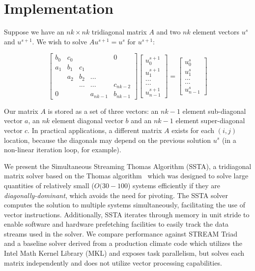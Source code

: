 \documentclass{sig-alternate-05-2015}
\begin{document}
\section{Implementation}
\label{sec:implementation}

Suppose we have an \(nk \times nk\) tridiagonal matrix \(A\) and two \(nk\) element
  vectors \(u^{s}\) and \(u^{s+1}\).  We wish to solve \(Au^{s+1} = u^{s}\) for
  \(u^{s+1}\):

\[
\begin{bmatrix}
b_0 & c_0 &     &          & 0        \\
a_1 & b_1 & c_1 &          &          \\
    & a_2 & b_2 & ...      &          \\
    &     & ... & ...      & c_{nk-2} \\
0   &     &     & a_{nk-1} & b_{nk-1}
\end{bmatrix}
\begin{bmatrix}
u^{s+1}_0     \\
u^{s+1}_1     \\
...     \\
...     \\
u^{s+1}_{n-1}
\end{bmatrix}
=
\begin{bmatrix}
u^{s}_0     \\
u^{s}_1     \\
...     \\
...     \\
u^{s}_{n-1}
\end{bmatrix}
\]

Our matrix \(A\) is stored as a set of three vectors: an \(nk-1\) element
  sub-diagonal vector \(a\), an \(nk\) element diagonal vector \(b\) and an
  \(nk-1\) element super-diagonal vector \(c\).
In practical applications, a different matrix \(A\) exists for each \((i,j)\)
  location, because the diagonals may depend on the previous solution \(u^{s}\)
  (in a non-linear iteration loop, for example).

We present the Simultaneous Streaming Thomas Algorithm (SSTA), a tridiagonal
  matrix solver based on the Thomas
  algorithm~\cite{ConteEtAlElementaryNumericalAnalysis,QuarteroniEtAl2007,TDMA}
  which was designed to solve large quantities of relatively small (\(O(30-100\))
  systems efficiently if they are \emph{diagonally-dominant}, which avoids
  the need for pivoting.
The SSTA solver computes the solution to multiple systems simultaneously, facilitating
  the use of vector instructions.
Additionally, SSTA iterates through memory in unit stride to enable software and 
  hardware prefetching facilities to easily track the data streams used in the solver.
We compare performance against STREAM Triad~\cite{stream} and a baseline solver
  derived from a production climate code which utilizes the Intel Math Kernel
  Library (MKL) and exposes task parallelism, but solves each matrix
  independently and does not utilize vector processing capabilities.
\end{document}
